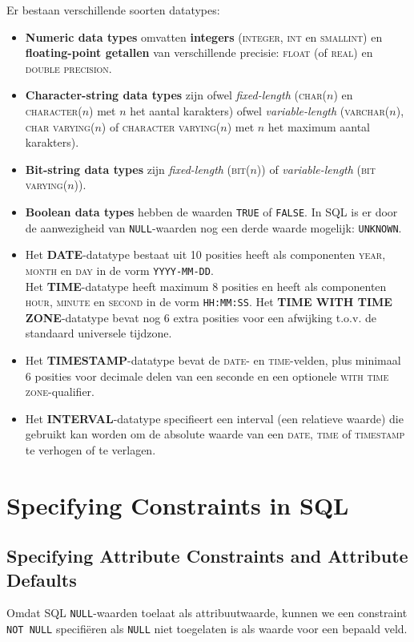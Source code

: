 Er bestaan verschillende soorten datatypes:
\begin{itemize}
	\item \textbf{Numeric data types} omvatten \textbf{integers} (\textsc{integer}, \textsc{int} en \textsc{smallint}) en \textbf{floating-point getallen} van verschillende precisie: \textsc{float} (of \textsc{real}) en \textsc{double precision}.
	\item \textbf{Character-string data types} zijn ofwel \textit{fixed-length} (\textsc{char}($n$) en \textsc{character}($n$) met $n$ het aantal karakters) ofwel \textit{variable-length} (\textsc{varchar}($n$), \textsc{char varying}($n$) of \textsc{character varying}($n$) met $n$ het maximum aantal karakters).
	\item \textbf{Bit-string data types} zijn \textit{fixed-length} (\textsc{bit}($n$)) of \textit{variable-length} (\textsc{bit varying}($n$)).
	\item \textbf{Boolean data types} hebben de waarden \texttt{TRUE} of \texttt{FALSE}. In SQL is er door de aanwezigheid van \texttt{NULL}-waarden nog een derde waarde mogelijk: \texttt{UNKNOWN}.
	\item Het \textbf{DATE}-datatype bestaat uit 10 posities heeft als componenten \textsc{year}, \textsc{month} en \textsc{day} in de vorm \texttt{YYYY-MM-DD}.\\
	Het \textbf{TIME}-datatype heeft maximum 8 posities en heeft als componenten \textsc{hour}, \textsc{minute} en \textsc{second} in de vorm \texttt{HH:MM:SS}. Het \textbf{TIME WITH TIME ZONE}-datatype bevat nog 6 extra posities voor een afwijking t.o.v. de standaard universele tijdzone.
	\item Het \textbf{TIMESTAMP}-datatype bevat de \textsc{date}- en \textsc{time}-velden, plus minimaal 6 posities voor decimale delen van een seconde en een optionele \textsc{with time zone}-qualifier.
	\item Het \textbf{INTERVAL}-datatype specifieert een interval (een relatieve waarde) die gebruikt kan worden om de absolute waarde van een \textsc{date}, \textsc{time} of \textsc{timestamp} te verhogen of te verlagen.
\end{itemize}



\section{Specifying Constraints in SQL}
\subsection{Specifying Attribute Constraints and Attribute Defaults}
Omdat SQL \texttt{NULL}-waarden toelaat als attribuutwaarde, kunnen we een constraint \texttt{NOT NULL} specifi\"eren als \texttt{NULL} niet toegelaten is als waarde voor een bepaald veld.

